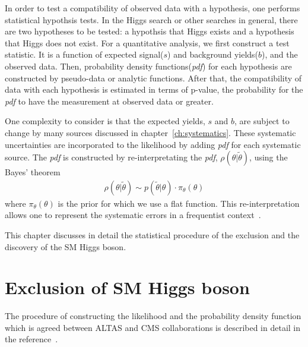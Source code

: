 In order to test a compatibility of observed data with a hypothesis, 
one performs statistical hypothsis tests. In the Higgs search or 
other searches in general, there are two hypotheses to be tested: 
a hypothsis that Higgs exists and a hypothesis that Higgs does not exist. 
For a quantitative analysis, we first construct a test statistic. 
It is a function of expected signal($s$) and background yields($b$),
and the observed data. Then, probability density functions(\textit{pdf}) for 
each hypothesis are constructed by pseudo-data or analytic functions. 
After that, the compatibility of data with each hypothesis is estimated
in terms of p-value, the probability for the \textit{pdf} to have the measurement 
at observed data or greater. 

One complexity to consider is that the 
expected yields, $s$ and $b$, are subject to change by many sources 
discussed in chapter~\ref{ch:systematics}. These systematic uncertainties 
are incorporated to the likelihood by adding \textit{pdf} for each systematic source. 
The \textit{pdf} is constructed by re-interpretating the \textit{pdf}, 
$\rho(\theta | \tilde{\theta})$, using the Bayes' theorem 
\begin{eqnarray} 
\rho(\theta | \tilde{\theta}) 
\sim 
p(\tilde{\theta} | \theta) \cdot \pi_\theta \left( \theta \right)  
\end{eqnarray} 
where $\pi_\theta \left( \theta \right)$ is the prior for which 
we use a flat function. This re-interpretation allows one to 
represent the systematic errors in a frequentist context~\cite{combination_stat}. 

This chapter discusses in detail the statistical procedure of the exclusion 
and the discovery of the SM Higgs boson.  

\section{Exclusion of SM Higgs boson}
\label{sec:stat_exclusion}

The procedure of constructing the likelihood and the probability density function 
which is agreed between ALTAS and CMS collaborations is
described in detail in the reference~\cite{combination_stat}.

